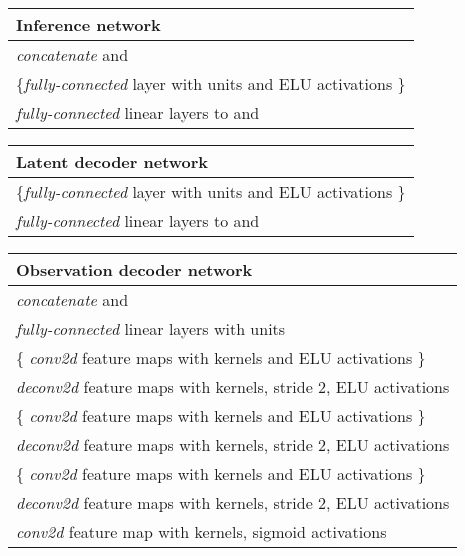 \documentclass{article} \usepackage{iclr2017_conference,times}
\begin{document}
\begin{table}[H]

    \begin{tabular}{  l}
    \bf{Inference network}  \\ \hline
    \emph{concatenate}  and  \\
     \{\emph{fully-connected} layer with  units and ELU activations \}\\
    \emph{fully-connected} linear layers to  and 
\label{table:omniglot_inference_network}
    \end{tabular}
\end{table}
\begin{table}[H]

    \begin{tabular}{  l}
    \bf{Latent decoder network}   \\ \hline
     \{\emph{fully-connected} layer with  units and ELU activations \}\\
    \emph{fully-connected} linear layers to  and 
\label{table:omniglot_latent_decoder_network}
    \end{tabular}   
\end{table}

\begin{table}[H]

    \begin{tabular}{  l}
    \bf{Observation decoder network}   \\ \hline
    \emph{concatenate}  and  \\
    \emph{fully-connected} linear layers with  units \\
     \{ \emph{conv2d}  feature maps with  kernels and ELU activations \} \\
    \emph{deconv2d}  feature maps with  kernels, stride 2, ELU activations \\
      \{ \emph{conv2d}  feature maps with  kernels and ELU activations \} \\
    \emph{deconv2d}  feature maps with  kernels, stride 2, ELU activations \\   
     \{ \emph{conv2d}  feature maps with  kernels and ELU activations \} \\
    \emph{deconv2d}  feature maps with  kernels, stride 2, ELU activations \\
    \emph{conv2d}  feature map with  kernels, sigmoid activations
\label{table:omniglot_observation_decoder_network}
    \end{tabular}   
\end{table}
\end{document}
